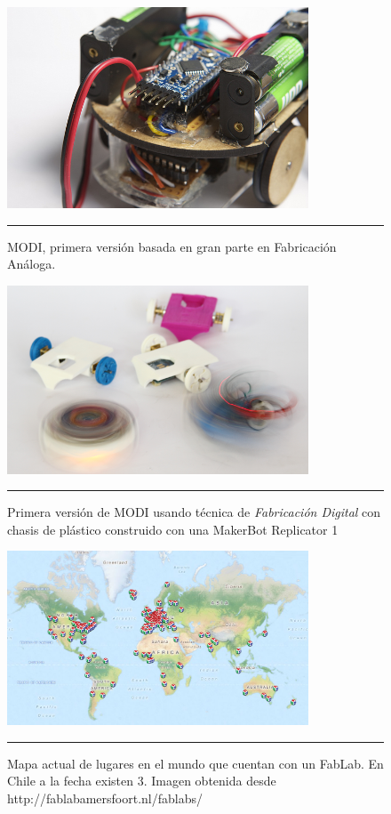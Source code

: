 \begin{figure}[htbp]
	\centering
		\includegraphics[width=0.8\textwidth]{./Pictures/2MODIrev1.jpg}
		\rule{35em}{0.5pt}
	\caption[modi2]{MODI, primera versión basada en gran parte en Fabricación Análoga.}
	\label{fig:modi2}
\end{figure}

\begin{figure}[htbp]
	\centering
		\includegraphics[width=0.8\textwidth]{./Pictures/MODIrev2.png}
		\rule{35em}{0.5pt}
	\caption[modirev1]{Primera versión de MODI usando técnica de \emph{ Fabricación Digital }con chasis de plástico construido con una MakerBot Replicator 1}
	\label{fig:modirev2}
\end{figure}

\begin{figure}[htbp]
	\centering
		\includegraphics[width=0.8\textwidth]{./Figures/map.png}
		\rule{35em}{0.5pt}
	\caption[modirev1]{Mapa actual de lugares en el mundo que cuentan con un FabLab. En Chile a la fecha existen 3. Imagen obtenida desde http://fablabamersfoort.nl/fablabs/}
	\label{fig:Fablabs}
\end{figure}	

